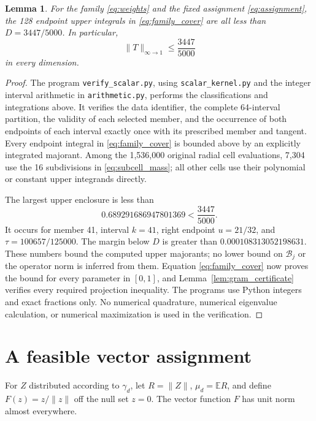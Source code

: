 \documentclass[11pt]{article}
\newtheorem{lemma}[theorem]{Lemma}
\theoremstyle{remark}\newtheorem{remark}[theorem]{Remark}
\newcommand{\E}{\mathbb E}
\newcommand{\norm}[1]{\lVert #1\rVert}
\begin{document}
\begin{lemma}\label{lem:certificate}
For the family \eqref{eq:weights} and the fixed assignment
\eqref{eq:assignment}, the 128 endpoint upper integrals in
\eqref{eq:family_cover} are all less than \(D=3447/5000\).
In particular,
\begin{equation}\label{eq:scalar}
\norm T_{\infty\to1}\le\frac{3447}{5000}
\end{equation}
in every dimension.
\end{lemma}
\begin{proof}
The program \texttt{verify\_scalar.py}, using
\texttt{scalar\_kernel.py} and the integer interval arithmetic in
\texttt{arithmetic.py}, performs the classifications and integrations
above. It verifies the data identifier, the complete 64-interval
partition, the validity of each selected member, and the occurrence
of both endpoints of each interval exactly once with its prescribed
member and tangent. Every endpoint integral in
\eqref{eq:family_cover} is bounded above by an explicitly integrated
majorant. Among the 1,536,000 original radial cell evaluations,
7,304 use the 16 subdivisions in \eqref{eq:subcell_mass}; all other
cells use their polynomial or constant upper integrands directly.

The largest upper enclosure is less than
\[
0.689291686947801369<\frac{3447}{5000}.
\]
It occurs for member 41, interval \(k=41\), right endpoint
\(u=21/32\), and \(\tau=100657/125000\). The margin below \(D\)
is greater than \(0.000108313052198631\). These numbers bound the
computed upper majorants; no lower bound on \(\mathcal B_j\) or
the operator norm is inferred from them. Equation
\eqref{eq:family_cover} now proves the bound for every parameter in
\([0,1]\), and Lemma~\ref{lem:gram_certificate} verifies every
required projection inequality. The programs use Python integers
and exact fractions only. No numerical quadrature, numerical
eigenvalue calculation, or numerical maximization is used in the
verification.
\end{proof}

\section{A feasible vector assignment}

For \(Z\) distributed according to \(\gamma_d\), let
\(R=\norm Z\), \(\mu_d=\E R\), and define
\(F(z)=z/\norm z\) off the null set \(z=0\). The vector function
\(F\) has unit norm almost everywhere.
\end{document}
